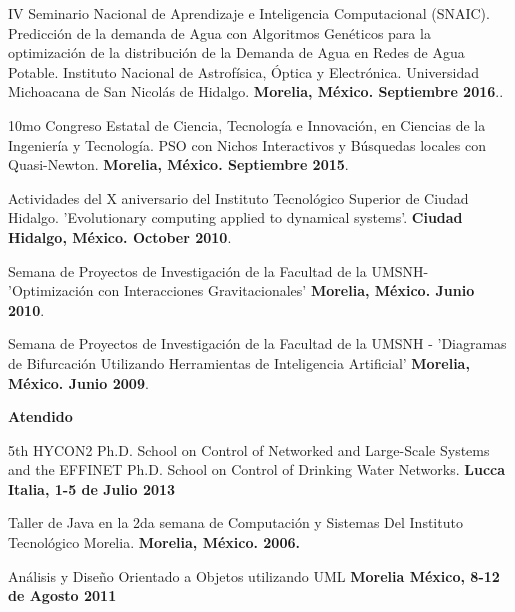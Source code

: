 \documentclass[7pt]{article}
\newenvironment{innerlist}[1][\enskip\textbullet]%
        {\begin{compactitem}[#1]}{\end{compactitem}}
\newcommand{\blankline}{\quad\pagebreak[2]}
\begin{document}
{\begin{innerlist}
\item IV Seminario Nacional de Aprendizaje e Inteligencia Computacional (SNAIC). Predicción de la demanda de Agua con Algoritmos Genéticos para la optimización de la distribución de la Demanda de Agua en Redes de Agua Potable. Instituto Nacional de Astrofísica, Óptica y Electrónica. Universidad Michoacana de San Nicolás de Hidalgo. \textbf{Morelia, México. Septiembre 2016}..
 \item 10mo Congreso Estatal de Ciencia, Tecnolog\'{i}a e Innovaci\'{o}n, en  Ciencias de la Ingenier\'{i}a y Tecnolog\'{i}a. PSO con Nichos Interactivos y B\'{u}squedas locales con Quasi-Newton. \textbf{Morelia, México. Septiembre 2015}.
 \item  Actividades del X aniversario del Instituto Tecnológico Superior de Ciudad Hidalgo. 'Evolutionary computing applied to dynamical systems'. \textbf{Ciudad Hidalgo, México. October 2010}.
\item Semana de Proyectos de Investigación de la Facultad de la UMSNH- 'Optimización con Interacciones Gravitacionales' \textbf{Morelia, México. Junio 2010}.
\item Semana de Proyectos de Investigación de la Facultad de la UMSNH - 'Diagramas de Bifurcación Utilizando Herramientas de Inteligencia Artificial' \textbf{Morelia, México. Junio 2009}.
\end{innerlist}

\blankline

\textbf{Atendido}
\begin{innerlist}
\item 5th HYCON2 Ph.D. School on Control of Networked and Large-Scale Systems and the EFFINET Ph.D. School on Control of Drinking Water Networks. \textbf{Lucca Italia, 1-5 de Julio 2013}
\item Taller de Java en la 2da semana de Computación y Sistemas Del Instituto Tecnológico Morelia. \textbf{Morelia, México. 2006.}
\item Análisis y Diseño Orientado a Objetos utilizando  UML  \textbf{Morelia México,  8-12 de Agosto 2011}

\end{innerlist}
\end{document}
